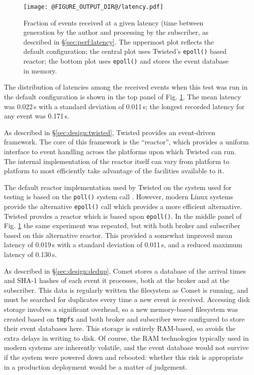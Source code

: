\documentclass[5p,authoryear]{elsarticle}
\begin{document}
\begin{figure}
  \begin{center}
  \texttt{[image: @FIGURE\_OUTPUT\_DIR@/latency.pdf]}
  \end{center}

  \caption{Fraction of events received at a given latency (time between
  generation by the author and processing by the subscriber, as described in
  \S\ref{sec:perf:latency}. The uppermost plot reflects the default
  configuration; the central plot uses Twisted's \texttt{epoll()} based
  reactor; the bottom plot uses \texttt{epoll()} and stores the event database
  in memory.}

  \label{fig:latency}
\end{figure}

The distribution of latencies among the received events when this test was run
in the default configuration is shown in the top panel of Fig.
\ref{fig:latency}. The mean latency was 0.022\,s with a standard deviation of
0.011\,s; the longest recorded latency for any event was 0.171\,s.

As described in \S\ref{sec:design:twisted}, Twisted provides an event-driven
framework. The core of this framework is the ``reactor'', which provides a
uniform interface to event handling across the platforms upon which Twisted
can run. The internal implementation of the reactor itself can vary from
platform to platform to most efficiently take advantage of the facilities
available to it.

The default reactor implementation used by Twisted on the system used for
testing is based on the \texttt{poll()} system call \citep{Posix1:2013}.
However, modern Linux systems provide the alternative \texttt{epoll()} call
\citep{Kerrisk:2014} which provides a more efficient alternative. Twisted
provdes a reactor which is based upon \texttt{epoll()}. In the middle panel of
Fig. \ref{fig:latency} the same experiment was repeated, but with both broker
and subscriber based on this alternative reactor. This provided a somewhat
improved mean latency of 0.019\,s with a standard deviation of 0.011\,s, and a
reduced maximum latency of 0.130\,s.

As described in \S\ref{sec:design:dedup}, Comet stores a database of the
arrival times and SHA-1 hashes of each event it processes, both at the broker
and at the subscriber. This data is regularly written the filesystem as Comet
is running, and must be searched for duplicates every time a new event is
received. Accessing disk storage involves a significant overhead, so a new
memory-based filesystem was created based on \texttt{tmpfs}
\citep{Kerrisk:2014} and both broker and subscriber were configured to store
their event databases here. This storage is entirely RAM-based, so avoids the
extra delays in writing to disk. Of course, the RAM technologies typically
used in modern systems are inherently volatile, and the event database would
not survive if the system were powered down and rebooted: whether this risk is
appropriate in a production deployment would be a matter of judgement.
\end{document}
